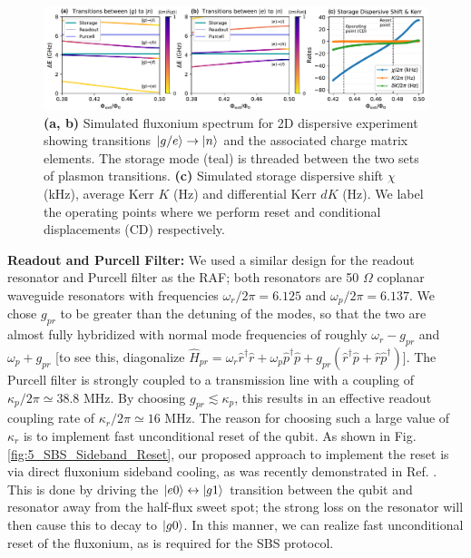 \begin{figure}[h]
    \centering
    \includegraphics[width=\linewidth]{Figures/5/2D_dispersive_metrics.pdf}
    \caption[Simulated metrics of interest for the 2D dispersive experiment.]{\textbf{(a, b)} Simulated fluxonium spectrum for 2D dispersive experiment showing transitions $\lvert g/e\rangle\to\lvert n\rangle$ and the associated charge matrix elements. The storage mode (teal) is threaded between the two sets of plasmon transitions. \textbf{(c)} Simulated storage dispersive shift $\chi$ (kHz), average Kerr $K$ (Hz) and differential Kerr $dK$ (Hz). We label the operating points where we perform reset and conditional displacements (CD) respectively.}
    \label{fig:5_2D_dispersive_metrics}
\end{figure}

\noindent \textbf{Readout and Purcell Filter:} We used a similar design for the readout resonator and Purcell filter as the RAF; both resonators are 50 $\Omega$ coplanar waveguide resonators with frequencies $\omega_r/2\pi = 6.125$ and $\omega_p/2\pi = 6.137$. We chose $g_{pr}$ to be greater than the detuning of the modes, so that the two are almost fully hybridized with normal mode frequencies of roughly $\omega_r - g_{pr}$ and $\omega_p + g_{pr}$ [to see this, diagonalize $\hat{H}_{pr} = \omega_r\hat{r}^\dagger \hat{r} + \omega_p\hat{p}^\dagger \hat{p} + g_{pr}(\hat{r}^\dagger\hat{p} + \hat{r}\hat{p}^\dagger)$]. The Purcell filter is strongly coupled to a transmission line with a coupling of $\kappa_p/2\pi \simeq 38.8$ MHz. By choosing $g_{pr} \lesssim \kappa_p$, this results in an effective readout coupling rate of $\kappa_r/2\pi \simeq 16$ MHz. The reason for choosing such a large value of $\kappa_r$ is to implement fast unconditional reset of the qubit. As shown in Fig. \ref{fig:5_SBS_Sideband_Reset}, our proposed approach to implement the reset is via direct fluxonium sideband cooling, as was recently demonstrated in Ref. \cite{najera2024high}. This is done by driving the $\lvert e0\rangle\leftrightarrow\lvert g1\rangle$ transition between the qubit and resonator away from the half-flux sweet spot; the strong loss on the resonator will then cause this to decay to $\lvert g0\rangle$. In this manner, we can realize fast unconditional reset of the fluxonium, as is required for the SBS protocol.

